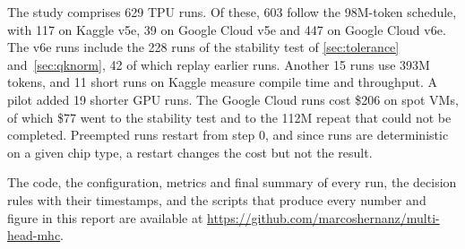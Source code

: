 \documentclass[11pt, a4paper]{article}
\begin{document}
The study comprises 629 TPU runs. Of these, 603 follow the 98M-token schedule, with 117 on Kaggle v5e, 39 on Google Cloud v5e and 447 on Google
Cloud v6e. The v6e runs include the 228 runs of the stability test of \cref{sec:tolerance} and~\cref{sec:qknorm}, 42 of which
replay earlier runs. Another 15 runs use 393M tokens, and 11 short runs on Kaggle measure compile time and throughput. A pilot
added 19 shorter GPU runs. The Google Cloud runs cost \$206 on spot VMs, of which \$77 went to the stability test and to the 112M
repeat that could not be completed. Preempted runs restart from step 0, and since runs are deterministic on a given chip type, a
restart changes the cost but not the result.

The code, the configuration, metrics and final summary of every run, the decision rules with their timestamps, and the scripts that
produce every number and figure in this report are available at \url{https://github.com/marcoshernanz/multi-head-mhc}.
\end{document}
